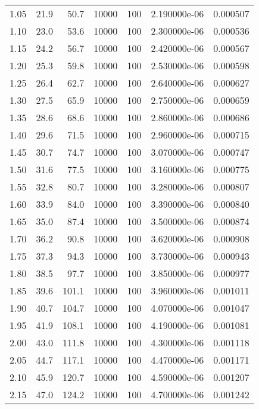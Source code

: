 \begin{tabular}{rrrrrrr}
    1.05 &      21.9 &      50.7 & 10000 &  100 & 2.190000e-06 & 0.000507 \\
    1.10 &      23.0 &      53.6 & 10000 &  100 & 2.300000e-06 & 0.000536 \\
    1.15 &      24.2 &      56.7 & 10000 &  100 & 2.420000e-06 & 0.000567 \\
    1.20 &      25.3 &      59.8 & 10000 &  100 & 2.530000e-06 & 0.000598 \\
    1.25 &      26.4 &      62.7 & 10000 &  100 & 2.640000e-06 & 0.000627 \\
    1.30 &      27.5 &      65.9 & 10000 &  100 & 2.750000e-06 & 0.000659 \\
    1.35 &      28.6 &      68.6 & 10000 &  100 & 2.860000e-06 & 0.000686 \\
    1.40 &      29.6 &      71.5 & 10000 &  100 & 2.960000e-06 & 0.000715 \\
    1.45 &      30.7 &      74.7 & 10000 &  100 & 3.070000e-06 & 0.000747 \\
    1.50 &      31.6 &      77.5 & 10000 &  100 & 3.160000e-06 & 0.000775 \\
    1.55 &      32.8 &      80.7 & 10000 &  100 & 3.280000e-06 & 0.000807 \\
    1.60 &      33.9 &      84.0 & 10000 &  100 & 3.390000e-06 & 0.000840 \\
    1.65 &      35.0 &      87.4 & 10000 &  100 & 3.500000e-06 & 0.000874 \\
    1.70 &      36.2 &      90.8 & 10000 &  100 & 3.620000e-06 & 0.000908 \\
    1.75 &      37.3 &      94.3 & 10000 &  100 & 3.730000e-06 & 0.000943 \\
    1.80 &      38.5 &      97.7 & 10000 &  100 & 3.850000e-06 & 0.000977 \\
    1.85 &      39.6 &     101.1 & 10000 &  100 & 3.960000e-06 & 0.001011 \\
    1.90 &      40.7 &     104.7 & 10000 &  100 & 4.070000e-06 & 0.001047 \\
    1.95 &      41.9 &     108.1 & 10000 &  100 & 4.190000e-06 & 0.001081 \\
    2.00 &      43.0 &     111.8 & 10000 &  100 & 4.300000e-06 & 0.001118 \\
    2.05 &      44.7 &     117.1 & 10000 &  100 & 4.470000e-06 & 0.001171 \\
    2.10 &      45.9 &     120.7 & 10000 &  100 & 4.590000e-06 & 0.001207 \\
    2.15 &      47.0 &     124.2 & 10000 &  100 & 4.700000e-06 & 0.001242 \\

\end{tabular}
